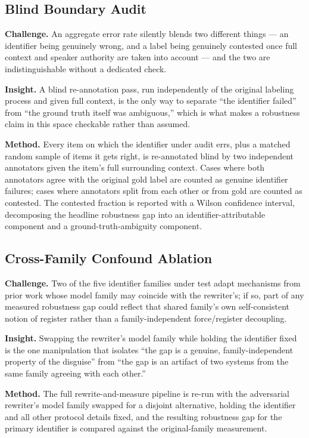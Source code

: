 \documentclass[11pt]{article}
\begin{document}
\subsection{Blind Boundary Audit}
\textbf{Challenge.} An aggregate error rate silently blends two different things --- an identifier being genuinely wrong, and a label being genuinely contested once full context and speaker authority are taken into account --- and the two are indistinguishable without a dedicated check.

\textbf{Insight.} A blind re-annotation pass, run independently of the original labeling process and given full context, is the only way to separate ``the identifier failed'' from ``the ground truth itself was ambiguous,'' which is what makes a robustness claim in this space checkable rather than assumed.

\textbf{Method.} Every item on which the identifier under audit errs, plus a matched random sample of items it gets right, is re-annotated blind by two independent annotators given the item's full surrounding context. Cases where both annotators agree with the original gold label are counted as genuine identifier failures; cases where annotators split from each other or from gold are counted as contested. The contested fraction is reported with a Wilson confidence interval, decomposing the headline robustness gap into an identifier-attributable component and a ground-truth-ambiguity component.

\subsection{Cross-Family Confound Ablation}
\textbf{Challenge.} Two of the five identifier families under test adapt mechanisms from prior work whose model family may coincide with the rewriter's; if so, part of any measured robustness gap could reflect that shared family's own self-consistent notion of register rather than a family-independent force/register decoupling.

\textbf{Insight.} Swapping the rewriter's model family while holding the identifier fixed is the one manipulation that isolates ``the gap is a genuine, family-independent property of the disguise'' from ``the gap is an artifact of two systems from the same family agreeing with each other.''

\textbf{Method.} The full rewrite-and-measure pipeline is re-run with the adversarial rewriter's model family swapped for a disjoint alternative, holding the identifier and all other protocol details fixed, and the resulting robustness gap for the primary identifier is compared against the original-family measurement.
\end{document}
